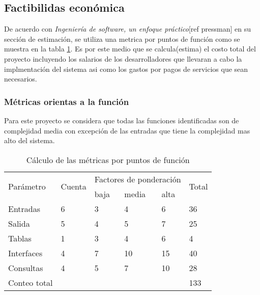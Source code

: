 \subsection{Factibilidas económica}

De acuerdo con \textit{Ingeniería de software, un enfoque práctico}[ref pressman] en su sección de estimación, se utiliza una metrica por puntos de función como se muestra en la tabla \ref{tab:function_point_metrics}. Es por este medio que se calcula(estima) el costo total del proyecto incluyendo los salarios de los desarrolladores que llevaran a cabo la implmentación del sistema asi como los gastos por pagos de servicios que sean necesarios.

\subsubsection{Métricas orientas a la función}


Para este proyecto se considera que todas las funciones identificadas son de complejidad media con excepción de las entradas que tiene la complejidad mas alto del sistema.


\begin{table}
	\begin{tabular}{|l|l|l|l|l|l|}
	\hline
	\multirow{2}{*}{Parámetro} & \multirow{2}{*}{Cuenta} & \multicolumn{3}{|l|}{Factores de ponderación} & \multirow{2}{*}{Total} \\ \cline{3-5}
														 &                         & baja       	& media       & alta		       &                        \\ \hline
	Entradas                   & 6                       & 3            & 4           & 6              & 36                     \\ \hline
	Salida                     & 5                       & 4            & 5           & 7              & 25                     \\ \hline
	Tablas                     & 1                       & 3            & 4           & 6              & 4                      \\ \hline
	Interfaces                 & 4                       & 7            & 10          & 15             & 40                     \\ \hline
	Consultas                  & 4                       & 5            & 7           & 10             & 28                     \\ \hline
	Conteo total               &                         &              &             &		             & 133                    \\ \hline
	\end{tabular}
	\caption{Cálculo de las métricas por puntos de función}
	\label{tab:function_point_metrics}
	\end{table}


